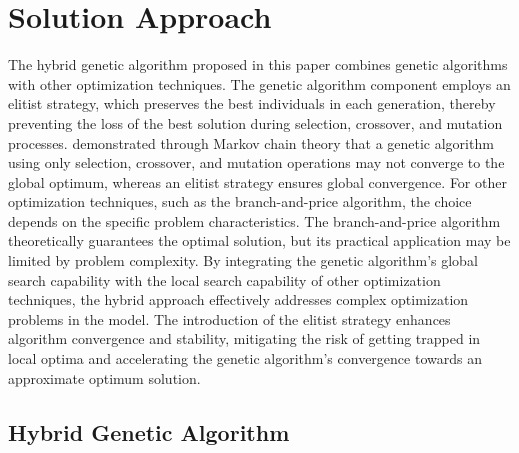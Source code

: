 \documentclass[]{article}
\theoremstyle{plain}%
\theoremstyle{definition}
\theoremstyle{remark}
\theoremstyle{plain}%
\begin{document}
    \section{Solution Approach}
    The hybrid genetic algorithm proposed in this paper combines genetic algorithms with other optimization techniques. The genetic algorithm component employs an elitist strategy, which preserves the best individuals in each generation, thereby preventing the loss of the best solution during selection, crossover, and mutation processes. \cite{rudolph1994convergence} demonstrated through Markov chain theory that a genetic algorithm using only selection, crossover, and mutation operations may not converge to the global optimum, whereas an elitist strategy ensures global convergence. For other optimization techniques, such as the branch-and-price algorithm, the choice depends on the specific problem characteristics. The branch-and-price algorithm theoretically guarantees the optimal solution, but its practical application may be limited by problem complexity.  By integrating the genetic algorithm's global search capability with the local search capability of other optimization techniques, the hybrid approach effectively addresses complex optimization problems in the model. The introduction of the elitist strategy enhances algorithm convergence and stability, mitigating the risk of getting trapped in local optima and accelerating the genetic algorithm's convergence towards an approximate optimum solution.
    
    \subsection{Hybrid Genetic Algorithm}
    
\end{document}
